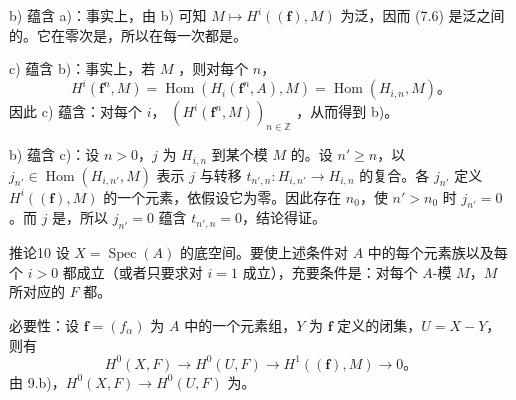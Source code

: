 b) 蕴含 a)：事实上，由 b) 可知 $M\mapsto H^i((\mathbf f),M)$ 为泛，因而 (7.6) 是泛之间的。它在零次是，所以在每一次都是。

c) 蕴含 b)：事实上，若 $M$ ，则对每个 $n$，
\[
H^i(\mathbf f^n,M)=\operatorname{Hom}(H_i(\mathbf f^n,A),M)
=\operatorname{Hom}(H_{i,n},M)。
\]
因此 c) 蕴含：对每个 $i$， $(H^i(\mathbf f^n,M))_{n\in\mathbb Z}$ ，从而得到 b)。

b) 蕴含 c)：设 $n>0$，$j$ 为 $H_{i,n}$ 到某个模 $M$ 的。设 $n'\ge n$，以
$j_{n'}\in\operatorname{Hom}(H_{i,n'},M)$ 表示 $j$ 与转移
$t_{n',n}:H_{i,n'}\to H_{i,n}$ 的复合。各 $j_{n'}$ 定义 $H^i((\mathbf f),M)$ 的一个元素，依假设它为零。因此存在 $n_0$，使 $n'>n_0$ 时 $j_{n'}=0$。而 $j$ 是，所以 $j_{n'}=0$ 蕴含 $t_{n',n}=0$，结论得证。
\begin{SGAresult}{推论}{10}
设 $X=\operatorname{Spec}(A)$ 的底空间。要使上述条件对 $A$ 中的每个元素族以及每个 $i>0$ 都成立（或者只要求对 $i=1$ 成立），充要条件是：对每个 $A$-模 $M$，$M$ 所对应的 $F$ 都。
\end{SGAresult}
必要性：设 $\mathbf f=(f_\alpha)$ 为 $A$ 中的一个元素组，$Y$ 为 $\mathbf f$ 定义的闭集，$U=X-Y$，则有
\[
H^0(X,F)\longrightarrow H^0(U,F)\longrightarrow H^1((\mathbf f),M)\longrightarrow0。
\]
由 9.b)，$H^0(X,F)\to H^0(U,F)$ 为。


